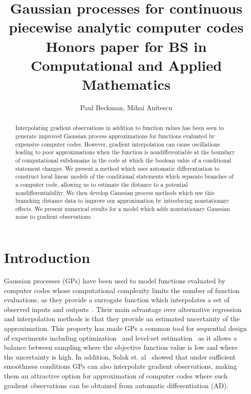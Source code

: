 \documentclass{article}
\title{\textbf{Gaussian processes for continuous piecewise analytic computer codes} \\[1.5ex] \large Honors paper for BS in Computational and Applied Mathematics}
\author{Paul Beckman, Mihai Anitescu}
\date{}
\begin{document}
\maketitle
\begin{abstract}
\noindent Interpolating gradient observations in addition to function values has been seen to generate improved Gaussian process approximations for functions evaluated by expensive computer codes. However, gradient interpolation can cause oscillations leading to poor approximations when the function is nondifferentiable at the boundary of computational subdomains in the code at which the boolean value of a conditional statement changes. We present a method which uses automatic differentiation to construct local linear models of the conditional statements which separate branches of a computer code, allowing us to estimate the distance to a potential nondifferentiability. We then develop Gaussian process methods which use this branching distance data to improve our approximation by introducing nonstationary effects. We present numerical results for a model which adds nonstationary Gaussian noise to gradient observations.
\end{abstract}

\section{Introduction}
Gaussian processes (GPs) have been used to model functions evaluated by computer codes whose computational complexity limits the number of function evaluations, as they provide a surrogate function which interpolates a set of observed inputs and outputs~\cite{sacks1989design}. Their main advantage over alternative regression and interpolation methods is that they provide an estimated uncertainty of the approximation. This property has made GPs a common tool for sequential design of experiments including optimization~\cite{jones1998efficient} and level-set estimation~\cite{ranjan2008sequential} as it allows a balance between sampling where the objective function value is low and where the uncertainty is high. In addition, Solak et. al~\cite{solak2003derivative} showed that under sufficient smoothness conditions GPs can also interpolate gradient observations, making them an attractive option for approximation of computer codes where such gradient observations can be obtained from automatic differentiation (AD).
\end{document}
